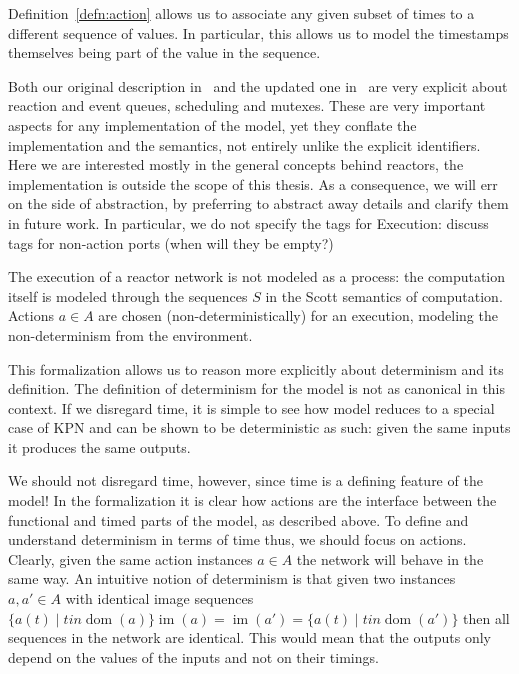 \begin{defn}
\begin{defn}
Definition~\ref{defn:action} allows us to associate any given subset of times to a different sequence of values.
In particular, this allows us to model the timestamps themselves being part of the value in the sequence.

Both our original description in~\cite{lohstroph_cyphy19} and the updated one in~\cite{lohstroh_phdthesis} are very explicit about reaction and event queues, scheduling and mutexes.
These are very important aspects for any implementation of the model, yet they conflate the implementation and the semantics, not entirely unlike the explicit identifiers.
Here we are interested mostly in the general concepts behind reactors, the implementation is outside the scope of this thesis.
As a consequence, we will err on the side of abstraction, by preferring to abstract away details and clarify them in future work. 
In particular, we do not specify the tags for 
Execution: discuss tags for non-action ports (when will they be empty?)

The execution of a reactor network is not modeled as a process: the computation itself is modeled through the sequences $S$ in the Scott semantics of computation.
Actions $a \in A$ are chosen (non-deterministically) for an execution, modeling the non-determinism from the environment.

This formalization allows us to reason more explicitly about determinism and its definition.
The definition of determinism for the model is not as canonical in this context.
If we disregard time, it is simple to see how model reduces to a special case of \ac{KPN} and can be shown to be deterministic as such: 
given the same inputs it produces the same outputs.

We should not disregard time, however, since time is a defining feature of the model!
In the formalization it is clear how actions are the interface between the functional and timed parts of the model, as described above.
To define and understand determinism in terms of time thus, we should focus on actions.
Clearly, given the same action instances $a \in A$ the network will behave in the same way.
An intuitive notion of determinism is that given two instances $a, a' \in A$ with identical image sequences $\{ a(t) \mid t in \operatorname{dom}(a) \} \operatorname{im}(a) = \operatorname{im}(a') = \{ a(t) \mid t in \operatorname{dom}(a') \}$ then all sequences in the network are identical.
This would mean that the outputs only depend on the values of the inputs and not on their timings.


\end{defn}
\end{defn}
